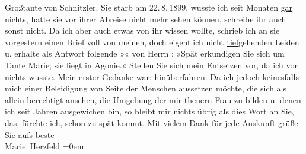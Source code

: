 \begin{ledgroupsized}[t]{13cm}
{{{                  Großtante von Schnitzler. Sie starb am 22. 8. 1899.}}}\label{K_L02591-2h}
               wusste ich seit Monaten \uline{gar} nichts, hatte sie vor
               ihrer Abreise nicht mehr sehen können, schreibe ihr auch sonst nicht. Da ich aber
               auch etwas von ihr wissen wollte, {\pb}schrieb ich an sie
               vorgestern einen Brief voll von meinen, doch eigentlich nicht \uline{tief}gehenden Leiden u. erhalte als Antwort folgende »\label{K_L02591-3v}\label{K_L02591-3h}« von
               Herrn \label{K_L02591-4v}\label{K_L02591-4h}: »Spät
               erkundigen Sie sich um Tante Marie; sie liegt
               in Agonie.« Stellen Sie sich mein Entsetzen vor, da ich von nichts wusste. Mein
               erster Gedanke war: hinüberfahren. Da ich {\pb}jedoch
               keinesfalls mich einer Beleidigung von Seite der Menschen aussetzen möchte, die sich
               als allein berechtigt ansehen, die Umgebung der mir theuern Frau zu bilden u. denen ich seit Jahren
               ausgewichen bin, so bleibt mir nichts übrig als dies Wort an Sie, das, fürchte ich,
               schon zu spät kommt. Mit vielem Dank für jede Auskunft\pend
           \pstart
           grüße Sie aufs beste {\\[\baselineskip]}\spacefill\mbox{Marie Herzfeld}\pend
           \leftskip=0em{}
         
         \endnumbering{}\end{ledgroupsized}  \newcommand{\dateiname}{L02591}\newcommand{\titel}{Marie Herzfeld an Arthur Schnitzler, 23. 8. 1899}\newcommand{\editorInnen}{Martin Anton Müller und Laura Untner}
      
